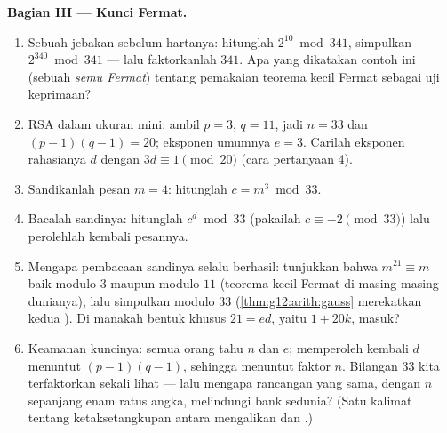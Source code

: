 \begin{problem}
\medskip
\noindent\textbf{Bagian III --- Kunci Fermat.}
\begin{enumerate}[resume]
  \item Sebuah jebakan sebelum hartanya: hitunglah
        $2^{10} \bmod 341$, simpulkan $2^{340} \bmod 341$ --- lalu
        faktorkanlah $341$. Apa yang dikatakan contoh ini (sebuah
        \emph{ semu Fermat}) tentang pemakaian teorema
        kecil Fermat sebagai uji keprimaan?
  \item RSA dalam ukuran mini: ambil $p = 3$, $q = 11$, jadi
        $n = 33$ dan $(p-1)(q-1) = 20$; eksponen umumnya
        $e = 3$. Carilah eksponen rahasianya $d$ dengan
        $3d \equiv 1 \pmod{20}$ (cara pertanyaan 4).
  \item Sandikanlah pesan $m = 4$: hitunglah
        $c = m^3 \bmod 33$.
  \item Bacalah sandinya: hitunglah $c^d \bmod 33$ (pakailah
        $c \equiv -2 \pmod{33}$) lalu perolehlah kembali pesannya.
  \item Mengapa pembacaan sandinya selalu berhasil: tunjukkan bahwa
        $m^{21} \equiv m$ baik modulo $3$ maupun modulo $11$
        (teorema kecil Fermat di masing-masing dunianya), lalu simpulkan
        modulo $33$ (\cref{thm:g12:arith:gauss} merekatkan kedua
        ). Di manakah bentuk khusus $21 = ed$, yaitu
        $1 + 20k$, masuk?
  \item Keamanan kuncinya: semua orang tahu $n$ dan $e$;
        memperoleh kembali $d$ menuntut $(p-1)(q-1)$, sehingga menuntut faktor
        $n$. Bilangan $33$ kita terfaktorkan sekali lihat --- lalu mengapa rancangan
        yang sama, dengan $n$ sepanjang enam ratus angka, melindungi
        bank sedunia? (Satu kalimat tentang ketaksetangkupan antara
        mengalikan dan .)
\end{enumerate}


\end{problem}
